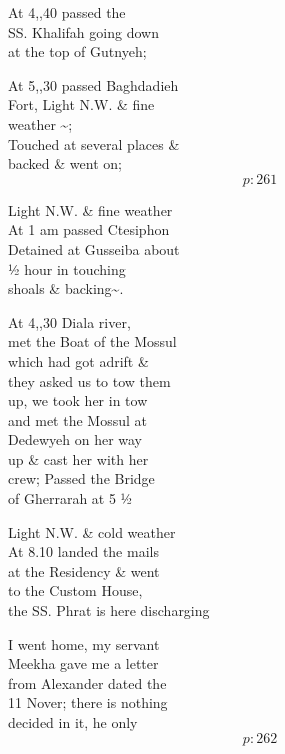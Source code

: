 \documentclass{report}
\begin{document}
	\par{
 	At 4,,40 passed the\ \\SS. Khalifah going down\ \\at the top of Gutnyeh;\ \\
	}

	\par{
 	At 5,,30 passed Baghdadieh\ \\Fort, Light N.W. \& fine\ \\weather \~{};\ \\Touched at several places \&\ \\backed \& went on;\ \\
  \[p: 261 \]

	}



	\par{
 	Light N.W. \& fine weather\ \\At 1 am passed Ctesiphon\ \\Detained at Gusseiba about\ \\½ hour in touching\ \\shoals \& backing\~{}.\ \\
	}

	\par{
 	At 4,,30 Diala river,\ \\met the Boat of the Mossul\ \\which had got adrift \&\ \\they asked us to tow them\ \\up, we took her in tow\ \\and met the Mossul at\ \\Dedewyeh on her way\ \\up \& cast her with her\ \\crew; Passed the Bridge\ \\of Gherrarah at 5 ½\ \\
	}

	\par{
 	Light N.W. \& cold weather\ \\At 8.10 landed the mails\ \\at the Residency \& went\ \\to the Custom House,\ \\the SS. Phrat is here discharging\ \\
	}

	\par{
 	I went home, my servant\ \\Meekha gave me a letter\ \\from Alexander dated the\ \\11 Nover; there is nothing\ \\decided in it, he only\ \\
  \[p: 262 \]

	}
\end{document}
